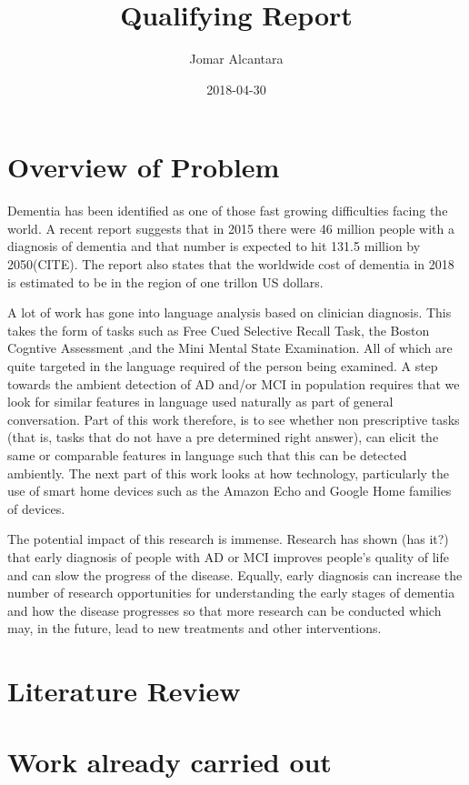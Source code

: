 \documentclass{article}
\title{Qualifying Report}
\date{2018-04-30}
\author{Jomar Alcantara}
\begin{document}
	\maketitle
	\newpage
	\section{Overview of Problem}
	
	Dementia has been identified as one of those fast growing difficulties facing the world. A recent report suggests that in 2015 there were 46 million people with a diagnosis of dementia and that number is expected to hit 131.5 million by 2050(CITE). The report also states that the worldwide cost of dementia in 2018 is estimated to be in the region of one trillon US dollars.
	\newline
	\par
	A lot of work has gone into language analysis based on clinician diagnosis. This takes the form of tasks such as Free Cued Selective Recall Task, the Boston Cogntive Assessment ,and the Mini Mental State Examination. All of which are quite targeted in the language required of the person being examined. A step towards the ambient detection of AD and/or MCI in population requires that we look for similar features in language used naturally as part of general conversation. Part of this work therefore, is to see whether non prescriptive tasks (that is, tasks that do not have a pre determined right answer), can elicit the same or comparable features in language such that this can be detected ambiently. The next part of this work looks at how technology, particularly the use of smart home devices such as the Amazon Echo and Google Home families of devices. 
	\newline
	\par
	The potential impact of this research is immense. Research has shown (has it?) that early diagnosis of people with AD or MCI improves people's quality of life and can slow the progress of the disease. Equally, early diagnosis can increase the number of research opportunities for understanding the early stages of dementia and how the disease progresses so that more research can be conducted which may, in the future, lead to new treatments and other interventions.
	
	\section{Literature Review}
	
	\section{Work already carried out}
	
\end{document}

